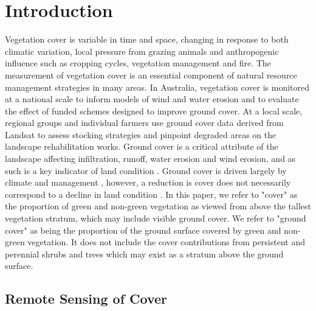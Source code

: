 \documentclass[remotesensing,article,accept,moreauthors,pdftex,12pt,a4paper]{mdpi}
\begin{document}

\section{Introduction}



Vegetation cover is variable in time and space, changing in response to both climatic variation, local pressure from grazing animals and anthropogenic influence such as cropping cycles, vegetation management and fire. The measurement of vegetation cover is an essential component of natural resource management strategies in many areas. In Australia, vegetation cover is monitored at a national scale to inform models of wind and water erosion and to evaluate the effect of funded schemes designed to improve ground cover. At a local scale, regional groups and individual farmers use ground cover data derived from Landsat to assess stocking strategies and pinpoint degraded areas on the landscape rehabilitation works. Ground cover is a critical attribute of the landscape affecting infiltration, runoff, water erosion and wind erosion, and as such is a key indicator of land condition \citep{Karfs2009}. Ground cover is driven largely by climate and management \citep{Dube2001}, however, a reduction is cover does not necessarily correspond to a decline in land condition \citep{Pickup1998}. In this paper, we refer to "cover" as the proportion of green and non-green vegetation as viewed from above the tallest vegetation stratum, which may include visible ground cover. We refer to "ground cover" as being the proportion of the ground surface covered by green and non-green vegetation. It does not include the cover contributions from persistent and perennial shrubs and trees which may exist as a stratum above the ground surface.
%
%
\subsection{Remote Sensing of Cover}
\end{document}
